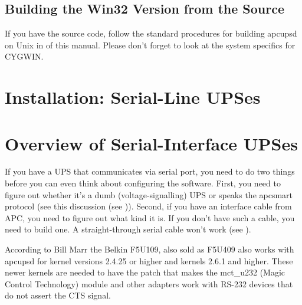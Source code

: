 {{{{{{{\label{Building-the-Win32-Version-from-the-Source}

\subsection*{Building the Win32 Version from the Source}

\label{index-Windows_002c-Building-187}
\label{index-Building_002c-Windows-188}
If you have the source code, follow the standard procedures for building
apcupsd on Unix in 
 of this manual. Please
don't forget to look at the system specifics for CYGWIN. 

\label{Installation-on-Serial_002dLine-UPSes}

\section*{Installation: Serial-Line UPSes}

\label{Overview-of-Serial_002dInterface-UPSes}

\section*{Overview of Serial-Interface UPSes}

\label{index-Serial-UPSes-189}
If you have a UPS that communicates via serial port, you need to do two things
before you can even think about configuring the software. First, you need to
figure out whether it's a dumb (voltage-signalling) UPS or speaks the apcsmart
protocol (see this discussion (see 
)).  Second, if you have an interface
cable from APC, you need to figure out what kind it is.  If you don't have
such a cable, you need to build one.  A straight-through serial cable won't
work (see 
).  

According to Bill Marr the Belkin F5U109, also sold as F5U409 also works with
apcupsd for kernel versions 2.4.25 or higher and kernels 2.6.1 and higher. 
These newer kernels are needed to have the patch that makes the mct\_u232
(Magic Control Technology) module and other adapters work with RS-232 devices
that do not assert the CTS signal. 

}}}}}}}
